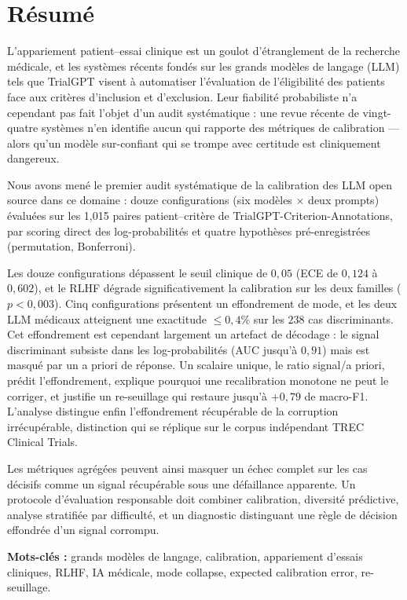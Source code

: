 
\chapter*{Résumé}

L'appariement patient--essai clinique est un goulot d'étranglement de la 
recherche médicale, et les systèmes récents fondés sur les grands modèles 
de langage (LLM) tels que TrialGPT visent à automatiser l'évaluation de 
l'éligibilité des patients face aux critères d'inclusion et d'exclusion. 
Leur fiabilité probabiliste n'a cependant pas fait l'objet d'un audit 
systématique : une revue récente de vingt-quatre systèmes n'en identifie 
aucun qui rapporte des métriques de calibration --- alors qu'un modèle 
sur-confiant qui se trompe avec certitude est cliniquement dangereux.

Nous avons mené le premier audit systématique de la calibration des LLM 
open source dans ce domaine : douze configurations (six modèles $\times$ 
deux prompts) évaluées sur les 1{,}015 paires patient--critère de 
TrialGPT-Criterion-Annotations, par scoring direct des log-probabilités 
et quatre hypothèses pré-enregistrées (permutation, Bonferroni).

Les douze configurations dépassent le seuil clinique de $0{,}05$ (ECE de 
$0{,}124$ à $0{,}602$), et le RLHF dégrade significativement la 
calibration sur les deux familles ($p < 0{,}003$). Cinq configurations 
présentent un effondrement de mode, et les deux LLM médicaux atteignent 
une exactitude $\leq 0{,}4\%$ sur les $238$ cas discriminants. Cet 
effondrement est cependant largement un artefact de décodage : le signal 
discriminant subsiste dans les log-probabilités (AUC jusqu'à $0{,}91$) 
mais est masqué par un a priori de réponse. Un scalaire unique, le ratio 
signal/a priori, prédit l'effondrement, explique pourquoi une 
recalibration monotone ne peut le corriger, et justifie un re-seuillage 
qui restaure jusqu'à $+0{,}79$ de macro-F1. L'analyse distingue enfin 
l'effondrement récupérable de la corruption irrécupérable, distinction 
qui se réplique sur le corpus indépendant TREC Clinical Trials.

Les métriques agrégées peuvent ainsi masquer un échec complet sur les 
cas décisifs comme un signal récupérable sous une défaillance apparente. 
Un protocole d'évaluation responsable doit combiner calibration, 
diversité prédictive, analyse stratifiée par difficulté, et un diagnostic 
distinguant une règle de décision effondrée d'un signal corrompu.

\vspace{0.5cm}
\noindent\textbf{Mots-clés :} grands modèles de langage, calibration, 
appariement d'essais cliniques, RLHF, IA médicale, mode collapse, 
expected calibration error, re-seuillage.

\cleardoublepage